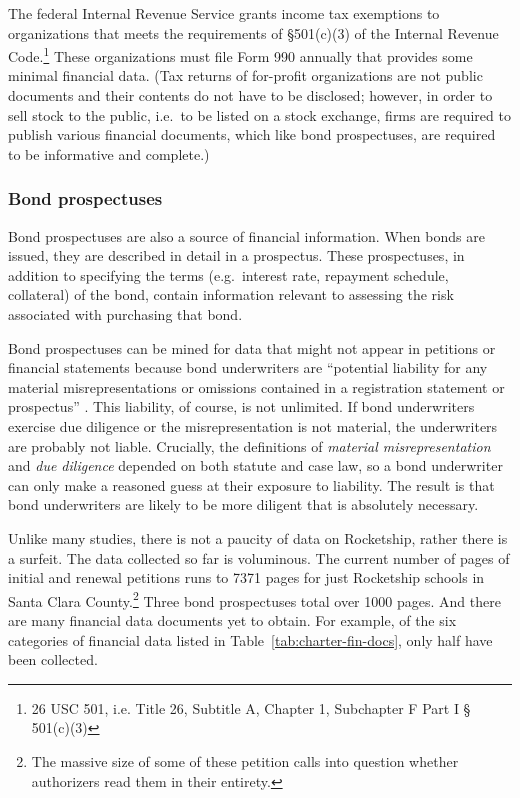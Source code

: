 The federal Internal Revenue Service grants income tax exemptions to organizations that meets the requirements of §501(c)(3) of the  Internal Revenue Code.\footnote{26 USC 501, i.e. Title 26, Subtitle A, Chapter 1, Subchapter F Part I § 501(c)(3)} These organizations must file Form 990 annually that provides some minimal financial data. (Tax returns of for-profit organizations are not public documents and their contents do not have to be disclosed; however, in order to sell stock to the public, i.e.~to be listed on a stock exchange, firms are required to publish various financial documents, which like bond prospectuses, are required to be informative and complete.) %

\subsubsection{Bond prospectuses}\indent

Bond prospectuses are also a source of financial information. When bonds are issued, they are  described in detail in a prospectus. These prospectuses, in addition to specifying the terms (e.g. interest rate, repayment schedule, collateral) of the bond, contain information relevant to assessing the risk associated with purchasing that bond.

Bond prospectuses can be mined for data that might not appear in petitions or financial statements because bond underwriters are ``potential liability for any material misrepresentations or omissions contained in a registration statement or prospectus'' \parencite{Block.etal2008}. This liability, of course, is not unlimited. If bond underwriters exercise due diligence or the misrepresentation is not material, the underwriters are probably not liable. Crucially, the definitions of \textit{material misrepresentation} and \textit{due diligence} depended on both statute and case law, so a bond underwriter can only make a reasoned guess at their exposure to liability. The result is that bond underwriters are likely to be more diligent that is absolutely necessary.

Unlike many studies, there is not a paucity of data on Rocketship, rather there is a surfeit. The data collected so far is voluminous. The current number of pages of initial and renewal petitions runs to 7371 pages for just Rocketship schools in Santa Clara County.\footnote{The massive size of some of these petition calls into question whether authorizers read them in their entirety.} Three bond prospectuses total over 1000 pages. And there are many financial data documents yet to obtain. For example, of the six categories of financial data listed in Table~\ref{tab:charter-fin-docs}, only half have been collected.

